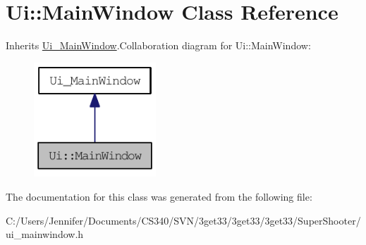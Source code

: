 \hypertarget{class_ui_1_1_main_window}{
\section{Ui::MainWindow Class Reference}
\label{class_ui_1_1_main_window}
}


Inherits \hyperlink{class_ui___main_window}{Ui\_\-MainWindow}.Collaboration diagram for Ui::MainWindow:\nopagebreak
\begin{figure}[H]
\begin{center}
\leavevmode
\includegraphics[width=130pt]{class_ui_1_1_main_window__coll__graph}
\end{center}
\end{figure}


The documentation for this class was generated from the following file:\begin{DoxyCompactItemize}
\item 
C:/Users/Jennifer/Documents/CS340/SVN/3get33/3get33/3get33/SuperShooter/ui\_\-mainwindow.h\end{DoxyCompactItemize}
